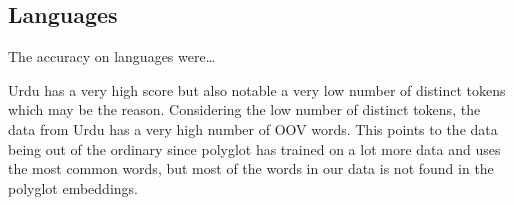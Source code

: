 
\subsection{Languages}

The accuracy on languages were\ldots


Urdu has a very high score but also notable a very low number of distinct tokens
which may be the reason. Considering the low number of distinct tokens, the data
from Urdu has a very high number of OOV words. This points to the data being out
of the ordinary since polyglot has trained on a lot more data and uses the most
common words, but most of the words in our data is not found in the polyglot
embeddings.

